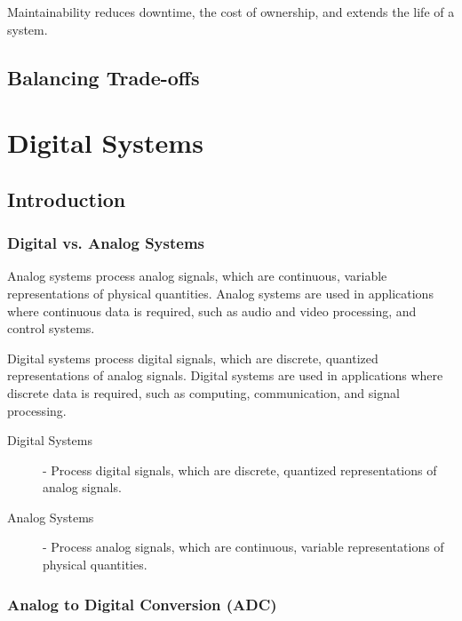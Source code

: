 \documentclass[12pt letter]{report}
\begin{document}
Maintainability reduces downtime, the cost of ownership, and extends the life of a system.

\section{Balancing Trade-offs}

\chapter{Digital Systems}

\section{Introduction}


\subsection{Digital vs. Analog Systems}


Analog systems process analog signals, which are continuous, variable representations of physical quantities. Analog systems
are used in applications where continuous data is required, such as audio and video processing, and control systems.


Digital systems process digital signals, which are discrete, quantized representations of analog signals. Digital systems
are used in applications where discrete data is required, such as computing, communication, and signal processing.


\begin{description}
  \item[Digital Systems] - Process digital signals, which are discrete, quantized representations of analog signals.
  \item[Analog Systems] - Process analog signals, which are continuous, variable representations of physical quantities.
\end{description}

\subsection{Analog to Digital Conversion (ADC)}
\end{document}

